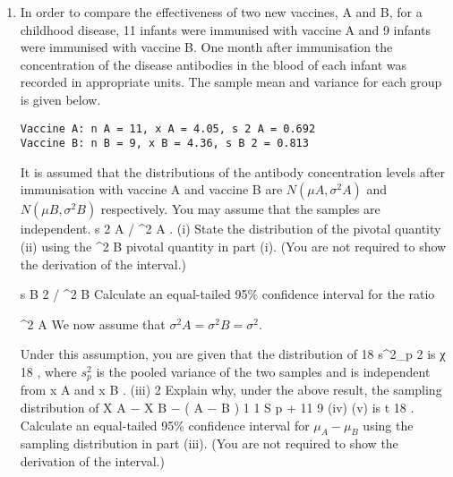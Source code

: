 \documentclass[a4paper,12pt]{article}
\begin{document}
\begin{enumerate}
\item 
In order to compare the effectiveness of two new vaccines, A and B, for a childhood disease, 11 infants were immunised with vaccine A and 9 infants were immunised with vaccine B. One month after immunisation the concentration of the disease
antibodies in the blood of each infant was recorded in appropriate units. The sample
mean and variance for each group is given below.
\begin{verbatim}
Vaccine A: n A = 11, x A = 4.05, s 2 A = 0.692
Vaccine B: n B = 9, x B = 4.36, s B 2 = 0.813
\end{verbatim}
It is assumed that the distributions of the antibody concentration levels after
immunisation with vaccine A and vaccine B are $N ( \mu A , \sigma^2 A )$ and $N ( \mu B , \sigma^2 B )$
respectively. You may assume that the samples are independent.
s 2 A / \sigma^2 A
.
(i) State the distribution of the pivotal quantity
(ii) using the
\sigma^2 B
pivotal quantity in part (i). (You are not required to show the derivation of the
interval.)

s B 2 / \sigma^2 B
Calculate an equal-tailed 95\% confidence interval for the ratio

\sigma^2 A
We now assume that $\sigma^2 A = \sigma^2 B = \sigma^2$. 

Under this assumption, you are given that the
distribution of
18 s^2_p
2
is χ 18
, where $s^2_p$ is the pooled variance of the two samples and
\sigma
is independent from x A and x B .
(iii)
2
Explain why, under the above result, the sampling distribution of
X A − X B − ( \mu A − \mu B )
1 1
S p
+
11 9
(iv)
(v)
is t 18 . 
Calculate an equal-tailed 95\% confidence interval for $\mu_A − \mu_B$ using the
sampling distribution in part (iii). (You are not required to show the derivation of the interval.) 

\end{enumerate}
\newpage
\end{document}
